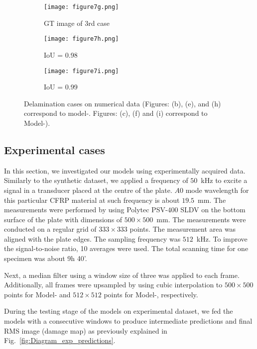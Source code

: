 \begin{sloppypar}
\begin{figure} [!ht]
\begin{subfigure}[b]{0.32\textwidth}
			\texttt{[image: figure7g.png]}
			\caption{GT image of 3rd case}
			\label{fig:num_GT_453}
		\end{subfigure}
		\hfill	
		\begin{subfigure}[b]{0.32\textwidth}
			\centering
			\texttt{[image: figure7h.png]}
			\caption{IoU = 0.98 }
			\label{fig:Convlstm_num_453}
		\end{subfigure}
		\hfill	
		\begin{subfigure}[b]{0.32\textwidth}
			\centering
			\texttt{[image: figure7i.png]}
			\caption{IoU = 0.99}
			\label{fig:AE_num_453}
		\end{subfigure}
		\caption{Delamination cases on numerical data (Figures: (b), (e), and (h) correspond to model-. 
			Figures: (c), (f) and (i) correspond to Model-).}
		\label{fig:num_case}
	\end{figure} 
	\clearpage
	\subsection{Experimental cases}
	In this section, we investigated our models using experimentally acquired data.
	Similarly to the synthetic dataset, we applied a frequency of \(50\)~kHz to excite a signal in a transducer placed at the centre of the plate. 
	\(A0\) mode wavelength for this particular CFRP material at such frequency is about \(19.5\)~mm. 
	The measurements were performed by using Polytec PSV-\(400\) SLDV on the bottom surface of the plate with dimensions of \(500\times 500\)~mm. 
	The measurements were conducted on a regular grid of \(333\times333\) points. 
	The measurement area was aligned with the plate edges.
	The sampling frequency was \(512\)~kHz.
	To improve the signal-to-noise ratio, 10 averages were used.
	The total scanning time for one specimen was about 9h 40'.
	
	Next, a median filter using a window size of three was applied to each frame. 
	Additionally, all frames were upsampled by using cubic interpolation to \(500 \times 500\) points for Model- and \(512\times512\) points for Model-, respectively.
	
	During the testing stage of the models on experimental dataset, we fed the models with a consecutive windows to produce intermediate predictions and final RMS image (damage map) as previously explained in Fig.~\ref{fig:Diagram_exp_predictions}.
	

\end{sloppypar}

